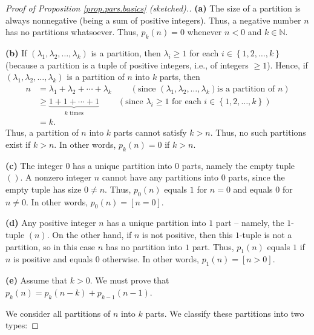 \begin{proof}
[Proof of Proposition \ref{prop.pars.basics} (sketched).]\textbf{(a)} The size
of a partition is always nonnegative (being a sum of positive integers). Thus,
a negative number $n$ has no partitions whatsoever. Thus, $p_{k}\left(
n\right)  =0$ whenever $n<0$ and $k\in\mathbb{N}$. \medskip

\textbf{(b)} If $\left(  \lambda_{1},\lambda_{2},\ldots,\lambda_{k}\right)  $
is a partition, then $\lambda_{i}\geq1$ for each $i\in\left\{  1,2,\ldots
,k\right\}  $ (because a partition is a tuple of positive integers, i.e., of
integers $\geq1$). Hence, if $\left(  \lambda_{1},\lambda_{2},\ldots
,\lambda_{k}\right)  $ is a partition of $n$ into $k$ parts, then%
\begin{align*}
n  &  =\lambda_{1}+\lambda_{2}+\cdots+\lambda_{k}\ \ \ \ \ \ \ \ \ \ \left(
\text{since }\left(  \lambda_{1},\lambda_{2},\ldots,\lambda_{k}\right)  \text{
is a partition of }n\right) \\
&  \geq\underbrace{1+1+\cdots+1}_{k\text{ times}}\ \ \ \ \ \ \ \ \ \ \left(
\text{since }\lambda_{i}\geq1\text{ for each }i\in\left\{  1,2,\ldots
,k\right\}  \right) \\
&  =k.
\end{align*}
Thus, a partition of $n$ into $k$ parts cannot satisfy $k>n$. Thus, no such
partitions exist if $k>n$. In other words, $p_{k}\left(  n\right)  =0$ if
$k>n$. \medskip

\textbf{(c)} The integer $0$ has a unique partition into $0$ parts, namely the
empty tuple $\left(  {}\right)  $. A nonzero integer $n$ cannot have any
partitions into $0$ parts, since the empty tuple has size $0\neq n$. Thus,
$p_{0}\left(  n\right)  $ equals $1$ for $n=0$ and equals $0$ for $n\neq0$. In
other words, $p_{0}\left(  n\right)  =\left[  n=0\right]  $. \medskip

\textbf{(d)} Any positive integer $n$ has a unique partition into $1$ part --
namely, the $1$-tuple $\left(  n\right)  $. On the other hand, if $n$ is not
positive, then this $1$-tuple is not a partition, so in this case $n$ has no
partition into $1$ part. Thus, $p_{1}\left(  n\right)  $ equals $1$ if $n$ is
positive and equals $0$ otherwise. In other words, $p_{1}\left(  n\right)
=\left[  n>0\right]  $. \medskip

\textbf{(e)} Assume that $k>0$. We must prove that $p_{k}\left(  n\right)
=p_{k}\left(  n-k\right)  +p_{k-1}\left(  n-1\right)  $.

We consider all partitions of $n$ into $k$ parts. We classify these partitions
into two types:


\end{proof}
